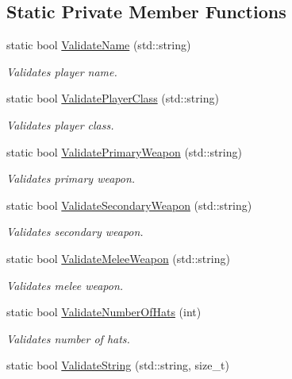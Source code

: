 \subsection*{Static Private Member Functions}
\begin{DoxyCompactItemize}
\item 
static bool \hyperlink{class_player_a47b1881f4f85d8c7189820e29b9593aa}{Validate\+Name} (std\+::string)
\begin{DoxyCompactList}\small\item\em Validates player name. \end{DoxyCompactList}\item 
static bool \hyperlink{class_player_a539c534db4ddbf1b644ed67f97770926}{Validate\+Player\+Class} (std\+::string)
\begin{DoxyCompactList}\small\item\em Validates player class. \end{DoxyCompactList}\item 
static bool \hyperlink{class_player_aff737357ce6ee4b79595a7926332efa9}{Validate\+Primary\+Weapon} (std\+::string)
\begin{DoxyCompactList}\small\item\em Validates primary weapon. \end{DoxyCompactList}\item 
static bool \hyperlink{class_player_adef14e77cfa9e23cb8539b80c658a487}{Validate\+Secondary\+Weapon} (std\+::string)
\begin{DoxyCompactList}\small\item\em Validates secondary weapon. \end{DoxyCompactList}\item 
static bool \hyperlink{class_player_a9c27dc39e03687c7091824dfb08cbd57}{Validate\+Melee\+Weapon} (std\+::string)
\begin{DoxyCompactList}\small\item\em Validates melee weapon. \end{DoxyCompactList}\item 
static bool \hyperlink{class_player_acc7b39eda1852834cefe01cb5acd7108}{Validate\+Number\+Of\+Hats} (int)
\begin{DoxyCompactList}\small\item\em Validates number of hats. \end{DoxyCompactList}\item 
static bool \hyperlink{class_player_afc04c20ec1540e20c932038f0854a990}{Validate\+String} (std\+::string, size\+\_\+t)

\end{DoxyCompactItemize}
